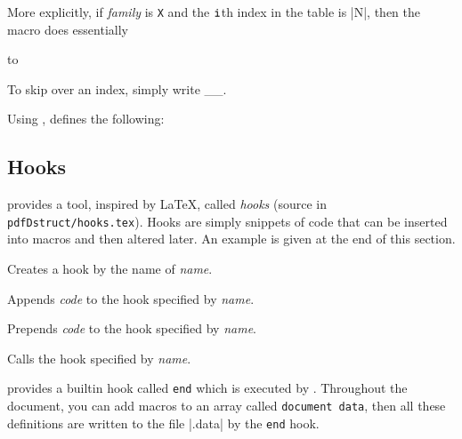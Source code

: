 More explicitly, if {\it family} is {\tt X} and the $\tt i$th index in the table is \inlinecode|\X N|, then the macro does essentially

\hbox to

To skip over an index, simply write \macro\__{}.
\emacroexp

Using \macro\mathfonttable, \pdftoolbox{} defines the following:

{\tabskip=2pt}

\subsection{Hooks}

\pdftoolbox{} provides a tool, inspired by \LaTeX, called {\it hooks} (source in {\tt pdfDstruct/hooks.tex}).
Hooks are simply snippets of code that can be inserted into macros and then altered later.
An example is given at the end of this section.

Creates a hook by the name of {\it name}.
\emacroexp

Appends {\it code} to the hook specified by {\it name}.
\emacroexp

Prepends {\it code} to the hook specified by {\it name}.
\emacroexp

Calls the hook specified by {\it name}.
\emacroexp

\pdftoolbox{} provides a builtin hook called {\tt end} which is executed by \macro\bye.
Throughout the document, you can add macros to an array called {\tt document data}, then all these definitions are written to the file \inlinecode|\jobname.data| by the {\tt end} hook.

